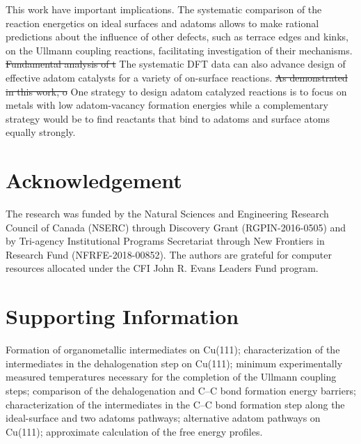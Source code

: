 \documentclass[aps,prb,amsmath,amssymb,11pt]{revtex4-1}
\newcommand*{\ACSNANO}{}
\newcommand{\sinfo}{Supporting Information}
\newcommand{\zhzh}{\color{blue}}
\begin{document}
This work have important implications. The systematic comparison of the reaction energetics on ideal surfaces and adatoms allows to make rational predictions about the influence of other defects, such as terrace edges and kinks, on the Ullmann coupling reactions, facilitating investigation of their mechanisms. 
\sout{Fundamental analysis of t} {\zhzh T}he systematic DFT data can also advance design of effective adatom catalysts for a variety of on-surface reactions. \sout{As demonstrated in this work, o} {\zhzh O}ne strategy to design adatom catalyzed reactions is to focus on metals with low adatom-vacancy formation energies while a complementary strategy would be to find reactants that bind to adatoms and surface atoms equally strongly. 

\ifdefined\ACSNANO



\fi

\section*{Acknowledgement}

The research was funded by the Natural Sciences and Engineering Research Council of Canada (NSERC) through Discovery Grant (RGPIN-2016-0505) and by Tri-agency Institutional Programs Secretariat through New Frontiers in Research Fund (NFRFE-2018-00852). The authors are grateful for computer resources allocated under the CFI John R. Evans Leaders Fund program.

\section*{\sinfo}

Formation of organometallic intermediates on Cu(111); characterization of the intermediates in the dehalogenation step on Cu(111); minimum experimentally measured temperatures necessary for the completion of the Ullmann coupling steps; comparison of the dehalogenation and C--C bond formation energy barriers; characterization of the intermediates in the C--C bond formation step along the ideal-surface and two adatoms pathways; alternative adatom pathways on Cu(111); approximate calculation of the free energy profiles. %

\end{document}
